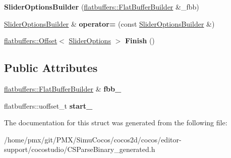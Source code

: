 \begin{DoxyCompactItemize}
{\bfseries Slider\+Options\+Builder} (\hyperlink{classflatbuffers_1_1FlatBufferBuilder}{flatbuffers\+::\+Flat\+Buffer\+Builder} \&\+\_\+fbb)
\item 
\mbox{\label{structflatbuffers_1_1SliderOptionsBuilder_a86e3db6cc1fb47adcfd4f10d2f577af3}} 
\hyperlink{structflatbuffers_1_1SliderOptionsBuilder}{Slider\+Options\+Builder} \& {\bfseries operator=} (const \hyperlink{structflatbuffers_1_1SliderOptionsBuilder}{Slider\+Options\+Builder} \&)
\item 
\mbox{\label{structflatbuffers_1_1SliderOptionsBuilder_a2dacc6d4af6e054e759d70728499b4c4}} 
\hyperlink{structflatbuffers_1_1Offset}{flatbuffers\+::\+Offset}$<$ \hyperlink{structflatbuffers_1_1SliderOptions}{Slider\+Options} $>$ {\bfseries Finish} ()
\end{DoxyCompactItemize}
\subsection*{Public Attributes}
\begin{DoxyCompactItemize}
\item 
\mbox{\label{structflatbuffers_1_1SliderOptionsBuilder_a7a5a0da3702f2d790ad38f30225c919e}} 
\hyperlink{classflatbuffers_1_1FlatBufferBuilder}{flatbuffers\+::\+Flat\+Buffer\+Builder} \& {\bfseries fbb\+\_\+}
\item 
\mbox{\label{structflatbuffers_1_1SliderOptionsBuilder_ab32418cf7d3adf0eaccd195ce23607c1}} 
flatbuffers\+::uoffset\+\_\+t {\bfseries start\+\_\+}
\end{DoxyCompactItemize}


The documentation for this struct was generated from the following file\+:\begin{DoxyCompactItemize}
\item 
/home/pmx/git/\+P\+M\+X/\+Simu\+Cocos/cocos2d/cocos/editor-\/support/cocostudio/C\+S\+Parse\+Binary\+\_\+generated.\+h\end{DoxyCompactItemize}
